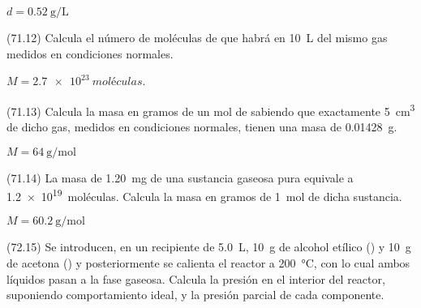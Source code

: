 \documentclass[10pt,a5paper,twoside]{article}
\begin{document}
    \begin{solution}
      \( d = \SI{0,52}{\gram\per\liter} \)
    \end{solution}



    \begin{exercise}[
        tags    = {},
        topics  = {química,química básica},
        source  = {FQ 1B MGH 2016, p71, e12},
      ]
      (71.12) Calcula el número de moléculas de  que habrá en \SI{10}{\liter} del mismo gas medidos en condiciones normales.
    \end{exercise}

    \begin{solution}
      \( M = \SI{2,7e23}{moléculas} \).
    \end{solution}




    \begin{exercise}[
        tags    = {},
        topics  = {química,química básica},
        source  = {FQ 1B MGH 2016, p71, e13},
      ]
      (71.13) Calcula la masa en gramos de un mol de  sabiendo que
      exactamente \SI{5}{\cubic\centi\meter} de dicho gas, medidos en condiciones
      normales, tienen una masa de \SI{0,01428}{\gram}.
    \end{exercise}

    \begin{solution}
      \( M = \SI{64}{\gram\per\mole} \)
    \end{solution}




    \begin{exercise}[
        tags    = {},
        topics  = {química,química básica},
        source  = {FQ 1B MGH 2016, p71, e14},
      ]
      (71.14) La masa de \SI{1,20}{\milli\gram} de una sustancia gaseosa pura equivale
      a \SI{1,2e19}{moléculas}. Calcula la masa en gramos de \SI{1}{\mole} de dicha sustancia.
    \end{exercise}

    \begin{solution}
      \( M = \SI{60,2}{\gram\per\mole} \)
    \end{solution}




    \begin{exercise}[
        tags    = {},
        topics  = {química,química básica},
        source  = {FQ 1B MGH 2016, p72, e15},
      ]
      (72.15) Se introducen, en un recipiente de \SI{5.0}{\liter}, \SI{10}{\gram} de alcohol etílico () y \SI{10}{\gram} de acetona () y posteriormente se calienta el reactor a \SI{200}{\celsius}, con lo cual ambos líquidos pasan a la fase gaseosa. Calcula la presión en el interior del reactor, suponiendo comportamiento ideal, y la presión parcial de cada componente.
    \end{exercise}
\end{document}
